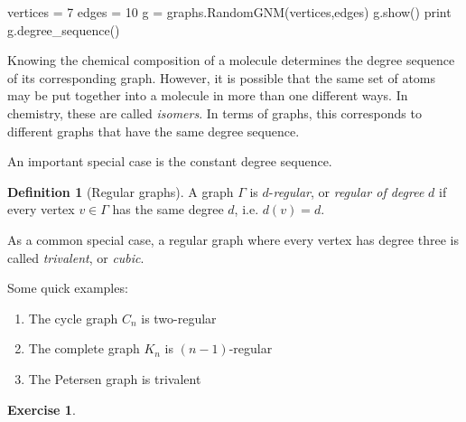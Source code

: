 \documentclass[10pt,]{book}
\theoremstyle{plain}
\theoremstyle{definition}
\newtheorem{definition}[theorem]{Definition}
\theoremstyle{definition}
\theoremstyle{definition}
\theoremstyle{definition}
\newtheorem{exercise}[theorem]{Exercise}
\numberwithin{equation}{section}
\begin{document}
\begin{sageinput}
vertices = 7
edges = 10
g = graphs.RandomGNM(vertices,edges)
g.show()
print g.degree_sequence()
\end{sageinput}
\hypertarget{p-29}{}%
Knowing the chemical composition of a molecule determines the degree sequence of its corresponding graph. However, it is possible that the same set of atoms may be put together into a molecule in more than one different ways. In chemistry, these are called \emph{isomers}.  In terms of graphs, this corresponds to different graphs that have the same degree sequence.%
\par
\hypertarget{p-30}{}%
An important special case is the constant degree sequence.%
\begin{definition}[{Regular graphs}]\label{definition-8}
\hypertarget{p-31}{}%
A graph \(\Gamma\) is \(d\)-\emph{regular}, or \emph{regular of degree} \(d\) if every vertex \(v\in\Gamma\) has the same degree \(d\), i.e. \(d(v)=d\).%
\end{definition}
\hypertarget{p-32}{}%
As a common special case, a regular graph where every vertex has degree three is called \emph{trivalent}, or \emph{cubic}.%
\par
\hypertarget{p-33}{}%
Some quick examples: \leavevmode%
\begin{enumerate}
\item\hypertarget{li-8}{}The cycle graph \(C_n\) is two-regular%
\item\hypertarget{li-9}{}The complete graph \(K_n\) is \((n-1)\)-regular%
\item\hypertarget{li-10}{}The Petersen graph is trivalent%
\end{enumerate}
%
\begin{exercise}\label{exercise-1}
\end{exercise}
\typeout{************************************************}
\typeout{************************************************}
\end{document}
